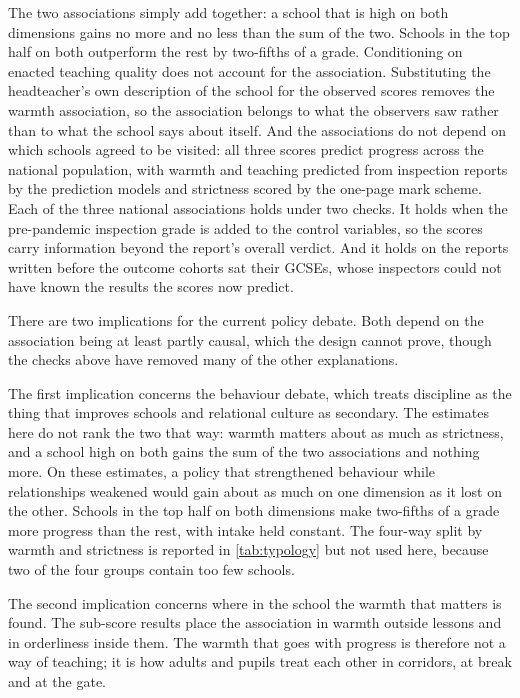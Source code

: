 The two associations simply add together: a school that is high on both dimensions gains no more and no less than the sum of the two. Schools in the top half on both outperform the rest by two-fifths of a grade. Conditioning on enacted teaching quality
does not account for the association. Substituting the headteacher's own description of the school for the observed scores removes the warmth association, so the association belongs to what the observers saw rather than to what the school says about itself. And the associations do not depend on which schools agreed to be visited: all three scores predict progress across the national population, with warmth and teaching predicted from inspection reports by the prediction models and strictness scored by the one-page mark scheme. Each of the three national associations holds under two checks. It holds when the pre-pandemic inspection grade is added to the control variables, so the scores carry information beyond the report's overall verdict. And it holds on the reports written before the outcome cohorts sat their GCSEs, whose inspectors could not have known the results the scores now predict.

There are two implications for the current policy debate. Both depend on the association being at least partly causal, which the design cannot prove, though the checks above have removed many of the other explanations.

The first implication concerns the behaviour debate, which treats discipline as the thing that improves schools and relational culture as secondary. The estimates here do not rank the two that way: warmth matters about as much as strictness, and a school high on both gains the sum of the two associations and nothing more. On these estimates, a policy that strengthened behaviour while relationships weakened would gain about as much on one dimension as it lost on the other. Schools in the top half on both dimensions make two-fifths of a grade more progress than the rest, with intake held constant. The four-way split by warmth and strictness is reported in \cref{tab:typology} but not used here, because two of the four groups contain too few schools.

The second implication concerns where in the school the warmth that matters is found. The sub-score results place the association in warmth outside lessons and in orderliness inside them. The warmth that goes with progress is therefore not a way of teaching; it is how adults and pupils treat each other in corridors, at break and at the gate.

